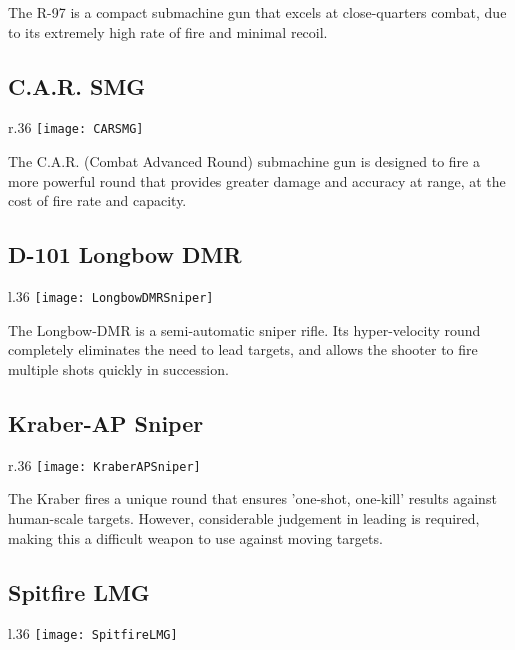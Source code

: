 The R-97 is a compact submachine gun that excels at close-quarters combat, due to its extremely high rate of fire and minimal recoil.

\subsection{C.A.R. SMG}
\begin{wrapfigure}[4]{r}{.36\linewidth}
\vspace*{-2em}
\texttt{[image: CARSMG]}
\end{wrapfigure}

The C.A.R. (Combat Advanced Round) submachine gun is designed to fire a more powerful round that provides greater damage and accuracy at range, at the cost of fire rate and capacity.


\subsection{D-101 Longbow DMR}
\begin{wrapfigure}[3]{l}{.36\linewidth}
\vspace*{-2em}
\texttt{[image: LongbowDMRSniper]}
\end{wrapfigure}

The Longbow-DMR is a semi-automatic sniper rifle. Its hyper-velocity round completely eliminates the need to lead targets, and allows the shooter to fire multiple shots quickly in succession.


\subsection{Kraber-AP Sniper}
\begin{wrapfigure}[4]{r}{.36\linewidth}
\vspace*{-2em}
\texttt{[image: KraberAPSniper]}
\end{wrapfigure}

The Kraber fires a unique round that ensures 'one-shot, one-kill' results against human-scale targets. However, considerable judgement in leading is required, making this a difficult weapon to use against moving targets.

\subsection{Spitfire LMG}
\begin{wrapfigure}[4]{l}{.36\linewidth}
\vspace*{-2em}
\texttt{[image: SpitfireLMG]}
\end{wrapfigure}

